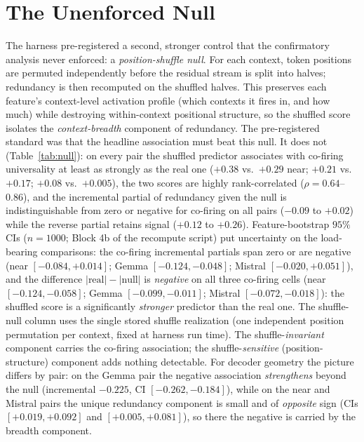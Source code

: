 \documentclass[11pt]{article}
\begin{document}
\section{The Unenforced Null}
\label{sec:null}
The harness pre-registered a second, stronger control that the confirmatory analysis never enforced: a
\emph{position-shuffle null}. For each context, token positions are permuted independently before the
residual stream is split into halves; redundancy is then recomputed on the shuffled halves. This preserves
each feature's context-level activation profile (which contexts it fires in, and how much) while
destroying within-context positional structure, so the shuffled score isolates the \emph{context-breadth}
component of redundancy. The pre-registered standard was that the headline association must beat this
null. It does not (Table~\ref{tab:null}): on every pair the shuffled predictor associates with co-firing
universality at least as strongly as the real one ($+0.38$ vs.\ $+0.29$ near; $+0.21$ vs.\ $+0.17$;
$+0.08$ vs.\ $+0.005$), the two scores are highly rank-correlated ($\rho=0.64$--$0.86$), and the
incremental partial of redundancy given the null is indistinguishable from zero or negative for
co-firing on all pairs ($-0.09$ to $+0.02$) while the reverse partial retains signal ($+0.12$ to
$+0.26$). Feature-bootstrap $95\%$ CIs ($n{=}1000$; Block 4b of the recompute script) put uncertainty on
the load-bearing comparisons: the co-firing incremental partials span zero or are negative (near
$[-0.084,+0.014]$; Gemma $[-0.124,-0.048]$; Mistral $[-0.020,+0.051]$), and the difference
$|\text{real}|-|\text{null}|$ is \emph{negative} on all three co-firing cells (near $[-0.124,-0.058]$;
Gemma $[-0.099,-0.011]$; Mistral $[-0.072,-0.018]$): the shuffled score is a significantly
\emph{stronger} predictor than the real one. The shuffle-null column uses the single stored shuffle
realization (one independent position permutation per context, fixed at harness run time). The
shuffle-\emph{invariant} component carries the co-firing association; the shuffle-\emph{sensitive}
(position-structure) component adds nothing detectable. For decoder geometry the picture differs by
pair: on the Gemma pair the negative association \emph{strengthens} beyond the null (incremental
$-0.225$, CI $[-0.262,-0.184]$), while on the near and Mistral pairs the unique redundancy component is
small and of \emph{opposite} sign (CIs $[+0.019,+0.092]$ and $[+0.005,+0.081]$), so there the negative
is carried by the breadth component.
\end{document}
